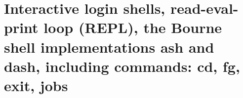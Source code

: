 
\chapter{Interactive login shells, read-eval-print loop (REPL), the Bourne shell implementations ash and dash, including commands: cd, fg, exit, jobs}


